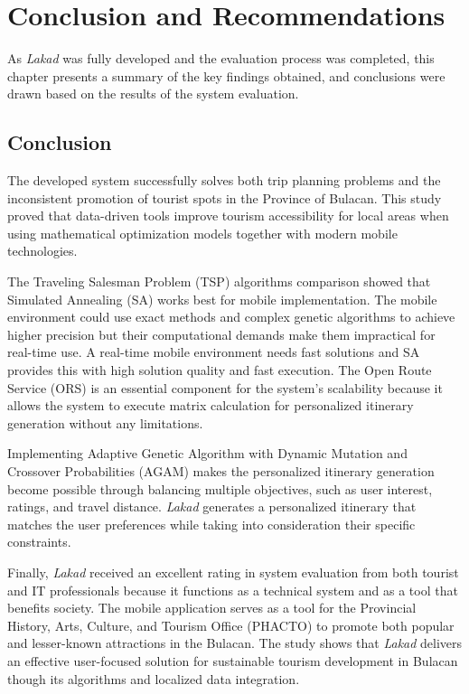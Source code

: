 \section{Conclusion and Recommendations}

As \textit{Lakad} was fully developed and the evaluation process was completed, this chapter presents a summary of the key findings obtained, and conclusions were drawn based on the results of the system evaluation.

\subsection{Conclusion}

The developed system successfully solves both trip planning problems and the inconsistent promotion of tourist spots in the Province of Bulacan. This study proved that data-driven tools improve tourism accessibility for local areas when using mathematical optimization models together with modern mobile technologies. 

The Traveling Salesman Problem (TSP) algorithms comparison showed that Simulated Annealing (SA) works best for mobile implementation. The mobile environment could use exact methods and complex genetic algorithms to achieve higher precision but their computational demands make them impractical for real-time use. A real-time mobile environment needs fast solutions and SA provides this with high solution quality and fast execution. The Open Route Service (ORS) is an essential component for the system's scalability because it allows the system to execute matrix calculation for personalized itinerary generation without any limitations.

Implementing Adaptive Genetic Algorithm with Dynamic Mutation and Crossover Probabilities (AGAM) makes the personalized itinerary generation become possible through balancing multiple objectives, such as user interest, ratings, and travel distance. \textit{Lakad} generates a personalized itinerary that matches the user preferences while taking into consideration their specific constraints.

Finally, \textit{Lakad} received an excellent rating in system evaluation from both tourist and IT professionals because it functions as a technical system and as a tool that benefits society. The mobile application serves as a tool for the Provincial History, Arts, Culture, and Tourism Office (PHACTO)  to promote both popular and lesser-known attractions in the Bulacan. The study shows that \textit{Lakad} delivers an effective user-focused solution for sustainable tourism development  in Bulacan though its algorithms and localized data integration.

